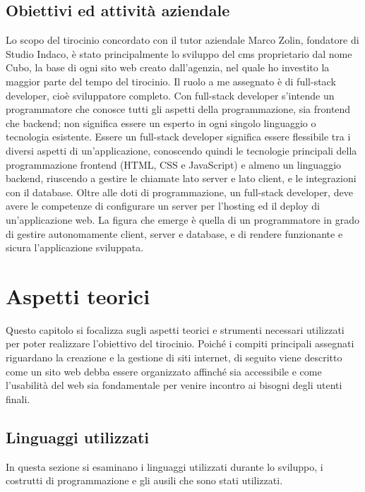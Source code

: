 \documentclass[12pt,a4paper]{article}
\begin{document}
\subsection{Obiettivi ed attività aziendale}
Lo scopo del tirocinio concordato con il tutor aziendale Marco Zolin, fondatore di Studio Indaco, è stato principalmente lo sviluppo del cms proprietario dal nome Cubo, la base di ogni sito web creato dall’agenzia, nel  quale ho investito la maggior parte del tempo del tirocinio.
Il ruolo a me assegnato è di full-stack developer, cioè sviluppatore completo. Con full-stack developer s'intende un programmatore che conosce tutti gli aspetti della programmazione, sia frontend che backend; non significa essere un esperto in ogni singolo linguaggio o tecnologia esistente. Essere un full-stack developer significa essere flessibile tra i diversi aspetti di un’applicazione, conoscendo quindi le tecnologie principali della programmazione frontend (HTML, CSS e JavaScript) e almeno un linguaggio backend, riuscendo a gestire le chiamate lato server e lato client, e le integrazioni con il database.
Oltre alle doti di programmazione, un full-stack developer, deve avere le competenze di configurare un server per l'hosting ed il deploy di un'applicazione web.
La figura che emerge è quella di un programmatore in grado di gestire autonomamente client, server e database, e di rendere funzionante e sicura l'applicazione sviluppata.
\clearpage
\section{Aspetti teorici}
Questo capitolo si focalizza sugli aspetti teorici e strumenti necessari utilizzati per poter realizzare l’obiettivo del tirocinio. Poiché i compiti principali assegnati riguardano la creazione e la gestione di siti internet, di seguito viene descritto come un sito web debba essere organizzato affinché sia accessibile e come l’usabilità del web sia fondamentale per venire incontro ai bisogni degli utenti finali.

\subsection{Linguaggi utilizzati}
In questa sezione si esaminano i linguaggi utilizzati durante lo sviluppo, i costrutti di programmazione e gli ausili che sono stati utilizzati.
\end{document}
